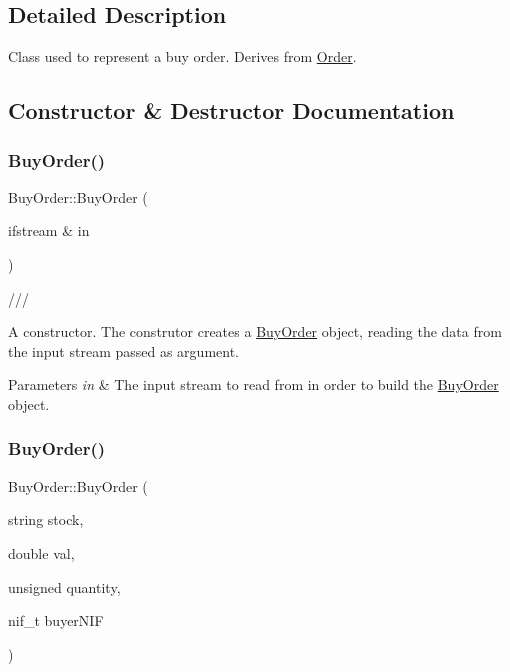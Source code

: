 \subsection{Detailed Description}
Class used to represent a buy order. Derives from \hyperlink{class_order}{Order}. 

\subsection{Constructor \& Destructor Documentation}
\hypertarget{class_buy_order_acbf093767d9d108b9448f2eefb5f58cd}{}\label{class_buy_order_acbf093767d9d108b9448f2eefb5f58cd} 
\subsubsection{\texorpdfstring{Buy\+Order()}{BuyOrder()}\hspace{0.1cm}{\footnotesize\ttfamily [1/2]}}
{\footnotesize\ttfamily Buy\+Order\+::\+Buy\+Order (\begin{DoxyParamCaption}\item[{ifstream \&}]{in }\end{DoxyParamCaption})}



/// 

A constructor. The construtor creates a \hyperlink{class_buy_order}{Buy\+Order} object, reading the data from the input stream passed as argument. 
\begin{DoxyParams}{Parameters}
{\em in} & The input stream to read from in order to build the \hyperlink{class_buy_order}{Buy\+Order} object. \\
\hline
\end{DoxyParams}
\hypertarget{class_buy_order_a1fcd1c4a28acdf04bfdf99c5b16b4e7d}{}\label{class_buy_order_a1fcd1c4a28acdf04bfdf99c5b16b4e7d} 
\subsubsection{\texorpdfstring{Buy\+Order()}{BuyOrder()}\hspace{0.1cm}{\footnotesize\ttfamily [2/2]}}
{\footnotesize\ttfamily Buy\+Order\+::\+Buy\+Order (\begin{DoxyParamCaption}\item[{string}]{stock,  }\item[{double}]{val,  }\item[{unsigned}]{quantity,  }\item[{nif\+\_\+t}]{buyer\+N\+IF }\end{DoxyParamCaption})}

